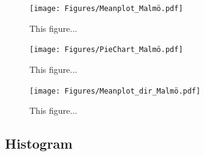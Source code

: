 \begin{figure}[H]
    \centering    \texttt{[image: Figures/Meanplot\_Malmö.pdf]}
    \caption{This figure...}
    \label{fig:Meanplot_Malmö}
\end{figure}

\begin{figure}[H]
    \centering    \texttt{[image: Figures/PieChart\_Malmö.pdf]}
    \caption{This figure...}
    \label{fig:PieChart_Malmö}
\end{figure}

\begin{figure}[H]
    \centering    \texttt{[image: Figures/Meanplot\_dir\_Malmö.pdf]}
    \caption{This figure...}
    \label{fig:Meanplot_dir_Malmö}
\end{figure}


\subsection{Histogram}

